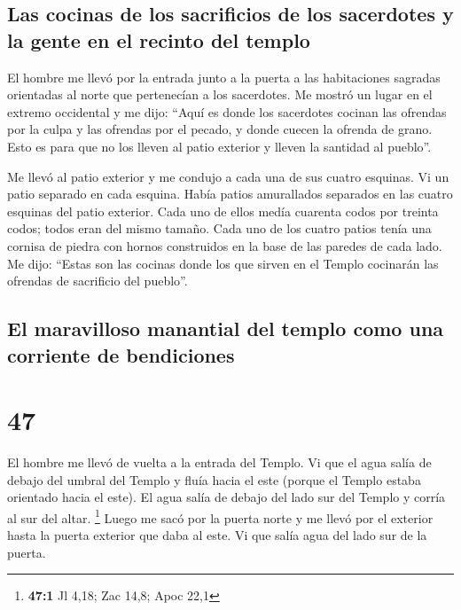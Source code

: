 \hypertarget{las-cocinas-de-los-sacrificios-de-los-sacerdotes-y-la-gente-en-el-recinto-del-templo}{%
\subsection{Las cocinas de los sacrificios de los sacerdotes y la gente
en el recinto del
templo}\label{las-cocinas-de-los-sacrificios-de-los-sacerdotes-y-la-gente-en-el-recinto-del-templo}}

 El hombre me llevó por la entrada junto a la puerta a
las habitaciones sagradas orientadas al norte que pertenecían a los
sacerdotes. Me mostró un lugar en el extremo occidental 
y me dijo: ``Aquí es donde los sacerdotes cocinan las ofrendas por la
culpa y las ofrendas por el pecado, y donde cuecen la ofrenda de grano.
Esto es para que no los lleven al patio exterior y lleven la santidad al
pueblo''.

 Me llevó al patio exterior y me condujo a cada una de
sus cuatro esquinas. Vi un patio separado en cada esquina.
 Había patios amurallados separados en las cuatro
esquinas del patio exterior. Cada uno de ellos medía cuarenta codos por
treinta codos; todos eran del mismo tamaño.  Cada uno de
los cuatro patios tenía una cornisa de piedra con hornos construidos en
la base de las paredes de cada lado.  Me dijo: ``Estas
son las cocinas donde los que sirven en el Templo cocinarán las ofrendas
de sacrificio del pueblo''.

\hypertarget{el-maravilloso-manantial-del-templo-como-una-corriente-de-bendiciones}{%
\subsection{El maravilloso manantial del templo como una corriente de
bendiciones}\label{el-maravilloso-manantial-del-templo-como-una-corriente-de-bendiciones}}

\hypertarget{section-46}{%
\section{47}\label{section-46}}

 El hombre me llevó de vuelta a la entrada del Templo. Vi
que el agua salía de debajo del umbral del Templo y fluía hacia el este
(porque el Templo estaba orientado hacia el este). El agua salía de
debajo del lado sur del Templo y corría al sur del altar. \footnote{\textbf{47:1}
  Jl 4,18; Zac 14,8; Apoc 22,1}  Luego me sacó por la
puerta norte y me llevó por el exterior hasta la puerta exterior que
daba al este. Vi que salía agua del lado sur de la puerta.

